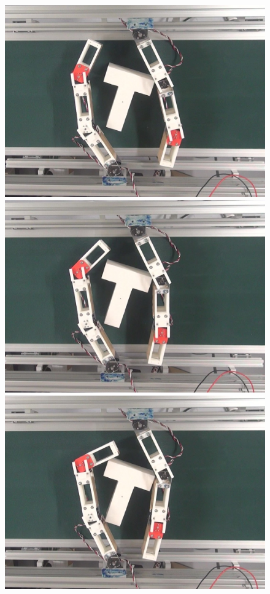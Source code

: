 \documentclass[a4paper,papersize,dvipdfmx]{mtabst}
\begin{document}
\begin{figure}[t]
\begin{minipage}{0.249\linewidth}
\centering
\includegraphics[width=0.9\linewidth]{fig/4-manipulation-result/TShape/2-1.jpg}
\end{minipage}\hfill
\begin{minipage}{0.249\linewidth}
\centering
\includegraphics[width=0.9\linewidth]{fig/4-manipulation-result/TShape/2-2.jpg}
\end{minipage}\hfill
\begin{minipage}{0.249\linewidth}
\centering
\includegraphics[width=0.9\linewidth]{fig/4-manipulation-result/TShape/2-3.jpg}

\end{minipage}
\end{figure}
\end{document}
